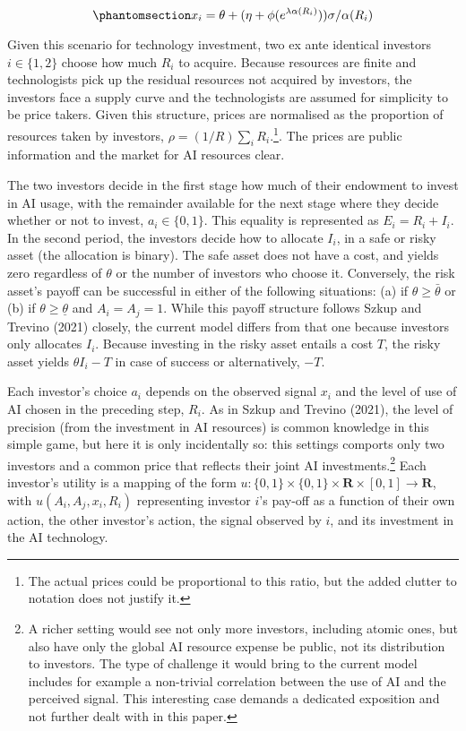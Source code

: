 \documentclass[
]{article}
\theoremstyle{definition}
\theoremstyle{plain}
\theoremstyle{remark}
\begin{document}
\begin{equation}\phantomsection\label{eq-privatesignals}{
x_i = \theta + (\eta + \phi(e^{\lambda \alpha(R_i)})) \sigma / \alpha(R_i)
}\end{equation}

Given this scenario for technology investment, two ex ante identical
investors \(i \in \{1,2\}\) choose how much \(R_i\) to acquire. Because
resources are finite and technologists pick up the residual resources
not acquired by investors, the investors face a supply curve and the
technologists are assumed for simplicity to be price takers. Given this
structure, prices are normalised as the proportion of resources taken by
investors, \(\rho = (1/R)\sum_i R_i\).\footnote{The actual prices could
  be proportional to this ratio, but the added clutter to notation does
  not justify it.}. The prices are public information and the market for
AI resources clear.

The two investors decide in the first stage how much of their endowment
to invest in AI usage, with the remainder available for the next stage
where they decide whether or not to invest, \(a_i \in \{0, 1\}\). This
equality is represented as \(E_i = R_i + I_i\). In the second period,
the investors decide how to allocate \(I_i\), in a safe or risky asset
(the allocation is binary). The safe asset does not have a cost, and
yields zero regardless of \(\theta\) or the number of investors who
choose it. Conversely, the risk asset's payoff can be successful in
either of the following situations: (a) if \(\theta \geq \bar{\theta}\)
or (b) if \(\theta \geq \underline{\theta}\) and \(A_i = A_j = 1\).
While this payoff structure follows Szkup and Trevino (2021) closely,
the current model differs from that one because investors only allocates
\(I_i\). Because investing in the risky asset entails a cost \(T\), the
risky asset yields \(\theta I_i - T\) in case of success or
alternatively, \(-T\).

Each investor's choice \(a_i\) depends on the observed signal \(x_i\)
and the level of use of AI chosen in the preceding step, \(R_i\). As in
Szkup and Trevino (2021), the level of precision (from the investment in
AI resources) is common knowledge in this simple game, but here it is
only incidentally so: this settings comports only two investors and a
common price that reflects their joint AI investments.\footnote{A richer
  setting would see not only more investors, including atomic ones, but
  also have only the global AI resource expense be public, not its
  distribution to investors. The type of challenge it would bring to the
  current model includes for example a non-trivial correlation between
  the use of AI and the perceived signal. This interesting case demands
  a dedicated exposition and not further dealt with in this paper.} Each
investor's utility is a mapping of the form
\(u : \{0, 1\} \times \{0, 1\} \times \mathbf{R} \times [0, 1] \to \mathbf{R}\),
with \(u(A_i, A_j, x_i, R_i)\) representing investor \(i\)'s pay-off as
a function of their own action, the other investor's action, the signal
observed by \(i\), and its investment in the AI technology.
\end{document}
